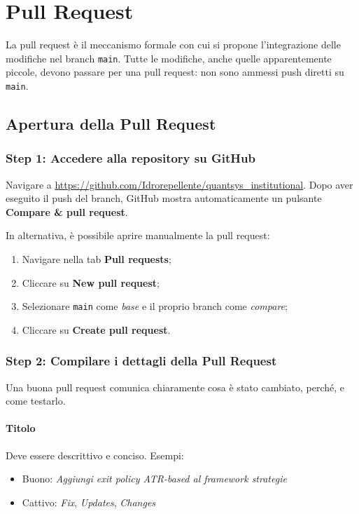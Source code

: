 \section{Pull Request}

La pull request è il meccanismo formale con cui si propone l'integrazione delle modifiche nel branch \texttt{main}. Tutte le modifiche, anche quelle apparentemente piccole, devono passare per una pull request: non sono ammessi push diretti su \texttt{main}.

\subsection{Apertura della Pull Request}

\subsubsection{Step 1: Accedere alla repository su GitHub}

Navigare a \url{https://github.com/Idrorepellente/quantsys_institutional}. Dopo aver eseguito il push del branch, GitHub mostra automaticamente un pulsante \textbf{Compare \& pull request}.

In alternativa, è possibile aprire manualmente la pull request:

\begin{enumerate}
  \item Navigare nella tab \textbf{Pull requests};
  \item Cliccare su \textbf{New pull request};
  \item Selezionare \texttt{main} come \emph{base} e il proprio branch come \emph{compare};
  \item Cliccare su \textbf{Create pull request}.
\end{enumerate}

\subsubsection{Step 2: Compilare i dettagli della Pull Request}

Una buona pull request comunica chiaramente cosa è stato cambiato, perché, e come testarlo.

\paragraph{Titolo} Deve essere descrittivo e conciso. Esempi:
\begin{itemize}
  \item Buono: \emph{Aggiungi exit policy ATR-based al framework strategie}
  \item Cattivo: \emph{Fix}, \emph{Updates}, \emph{Changes}
\end{itemize}

